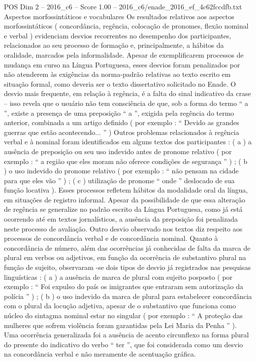 \begin{textsample}{POS Dim 2 – 2016\_c6 – Score 1.00 – 2016\_c6/enade\_2016\_ef\_4c62fccdfb.txt}
Aspectos morfossintáticos e vocabulares Os resultados relativos aos aspectos morfossintáticos ( concordância, regência, colocação de pronomes, flexão nominal e verbal ) evidenciam desvios recorrentes no desempenho dos participantes, relacionados ao seu processo de formação e, principalmente, a hábitos da oralidade, marcados pela informalidade.
Apesar de exemplificarem processos de mudança em curso na Língua Portuguesa, esses desvios foram penalizados por não atenderem às exigências da norma-padrão relativas ao texto escrito em situação formal, como deveria ser o texto dissertativo solicitado no Enade.
O desvio mais frequente, em relação à regência, é a falta do sinal indicativo da crase – isso revela que o usuário não tem consciência de que, sob a forma do termo “ a ”, existe a presença de uma preposição “ a ”, exigida pela regência do termo anterior, combinada a um artigo definido ( por exemplo : “ Devido as grandes guerras que estão acontecendo... ” ) Outros problemas relacionados à regência verbal e à nominal foram identificados em alguns textos dos participantes : ( a ) a ausência de preposição ou seu uso indevido antes de pronome relativo ( por exemplo : “ a região que eles moram não oferece condições de segurança ” ) ; ( b ) o uso indevido do pronome relativo ( por exemplo : “ não pensam na cidade para que eles vão ” ) ; ( c ) utilização de pronome “ onde ” deslocado de sua função locativa ).
Esses processos refletem hábitos da modalidade oral da língua, em situações de registro informal.
Apesar da possibilidade de que essa alteração de regência se generalize no padrão escrito da Língua Portuguesa, como já está ocorrendo até em textos jornalísticos, a ausência da preposição foi penalizada neste processo de avaliação.
Outro desvio observado nos textos diz respeito aos processos de concordância verbal e de concordância nominal.
Quanto à concordância de número, além das ocorrências já conhecidas de falta da marca de plural em verbos ou adjetivos, em função da ocorrência de substantivo plural na função de sujeito, observaram -se dois tipos de desvio já registrados nas pesquisas linguísticas : ( a ) a ausência de marca de plural com sujeito posposto ( por exemplo : “ Foi expulso do país os imigrantes que entraram sem autorização da polícia ” ) ; ( b ) o uso indevido da marca de plural para estabelecer concordância com o plural da locução adjetiva, apesar de o substantivo que funciona como núcleo do sintagma nominal estar no singular ( por exemplo : “ A proteção das mulheres que sofrem violência foram garantidas pela Lei Maria da Penha ” ).
Uma ocorrência generalizada foi a ausência de acento circunflexo na forma plural do presente do indicativo do verbo “ ter ”, que foi considerada como um desvio na concordância verbal e não meramente de acentuação gráfica.

\end{textsample}
